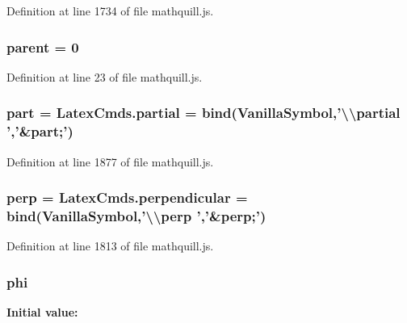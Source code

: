 Definition at line 1734 of file mathquill.\-js.

\subsubsection[{parent}]{\setlength{\rightskip}{0pt plus 5cm}{\bf \-\_\-} parent = 0}\label{mathquill_8js_a73c61f8f80bfb4ec7e57a9d4c9d1d738}


Definition at line 23 of file mathquill.\-js.

\subsubsection[{part}]{ part = Latex\-Cmds.\-partial = {\bf bind}({\bf Vanilla\-Symbol},'\textbackslash{}\textbackslash{}partial ','\&part;')}\label{mathquill_8js_ad065d16b2543f63b542ed1eba000cd1c}


Definition at line 1877 of file mathquill.\-js.

\subsubsection[{perp}]{ perp = Latex\-Cmds.\-perpendicular = {\bf bind}({\bf Vanilla\-Symbol},'\textbackslash{}\textbackslash{}perp ','\&perp;')}\label{mathquill_8js_a2c43871fdea12a69bcf062e24094d3c4}


Definition at line 1813 of file mathquill.\-js.

\subsubsection[{phi}]{ phi}\label{mathquill_8js_af35297f380f8f5f90259ce063b8432fa}
{\bfseries Initial value\-:}


